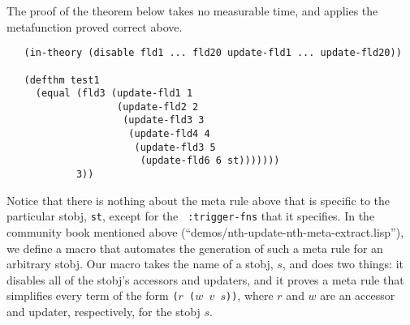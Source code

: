 \noindent The proof of the theorem below takes no measurable time, and
applies the metafunction proved correct above.

\begin{verbatim}
   (in-theory (disable fld1 ... fld20 update-fld1 ... update-fld20))

   (defthm test1
     (equal (fld3 (update-fld1 1
                   (update-fld2 2
                    (update-fld3 3
                     (update-fld4 4
                      (update-fld3 5
                       (update-fld6 6 st)))))))
            3))
\end{verbatim}

Notice that there is nothing about the meta rule above that is
specific to the particular stobj, {\tt st}, except for the {\tt
  :trigger-fns} that it specifies.  In the community book mentioned
above (``demos/nth-\allowbreak{}update-\allowbreak{}nth-\allowbreak{}meta-\allowbreak{}extract.lisp''), we define a macro
that automates the generation of such a meta rule for an
arbitrary stobj.  Our macro takes the name of a stobj, $s$, and does two
things: it disables all of the stobj's accessors and updaters, and it
proves a meta rule that simplifies every term of the form {\tt ($r$
  ($w$ $v$ $s$))}, where $r$ and $w$ are an accessor and updater,
respectively, for the stobj $s$.

